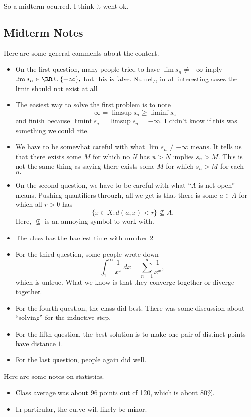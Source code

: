 














So a midterm ocurred. I think it went ok.

\subsection{Midterm Notes}
Here are some general comments about the content.
\begin{itemize}
	\item On the first question, many people tried to have $\lim s_n\ne-\infty$ imply $\lim s_n\in\RR\cup\{+\infty\},$ but this is false. Namely, in all interesting cases the limit should not exist at all.
	\item The easiest way to solve the first problem is to note
	\[-\infty=\limsup s_n\ge\liminf s_n\]
	and finish because $\liminf s_n=\limsup s_n=-\infty.$ I didn't know if this was something we could cite.
	\item We have to be somewhat careful with what $\lim s_n\ne-\infty$ means. It tells us that there exists some $M$ for which no $N$ has $n>N$ implies $s_n>M.$ This is not the same thing as saying there exists some $M$ for which $s_n>M$ for each $n.$
	\item On the second question, we have to be careful with what ``$A$ is not open'' means. Pushing quantifiers through, all we get is that there is some $a\in A$ for which all $r>0$ has
	\[\{x\in X:d(a,x)<r\}\not\subseteq A.\]
	Here, $\not\subseteq$ is an annoying symbol to work with.
	\item The class has the hardest time with number 2.
	\item For the third question, some people wrote down
	\[\int_1^\infty\frac1{x^x}\,dx=\sum_{n=1}^\infty\frac1{x^x},\]
	which is untrue. What we know is that they converge together or diverge together.
	\item For the fourth question, the class did best. There was some discussion about ``solving'' for the inductive step.
	\item For the fifth question, the best solution is to make one pair of distinct points have distance $1.$
	\item For the last question, people again did well.
\end{itemize}
Here are some notes on statistics.
\begin{itemize}
	\item Class average was about 96 points out of 120, which is about 80\%.
	\item In particular, the curve will likely be minor.
\end{itemize}

